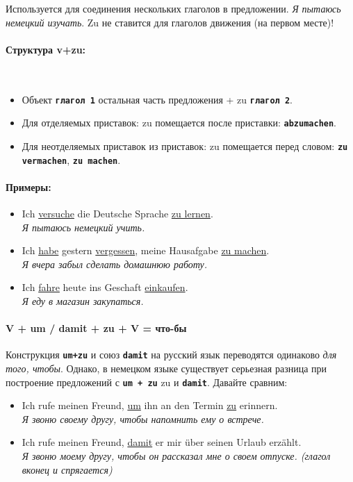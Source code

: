 \documentclass[12pt,a4paper]{report}
\newcommand{\term}[1]{\texttt{\textbf{#1}}}
\newcommand{\satzew}[1]{\underline{#1}}
\newcommand{\ubersatze}[1]{\textit{#1}}
\begin{document}
Используется для соединения нескольких глаголов в предложении. \ubersatze{Я пытаюсь немецкий изучать}. Zu не ставится для глаголов движения (на первом месте)!

\paragraph{Структура v+zu:} ~\\
\begin{itemize}
\item Объект \term{глагол 1} остальная часть предложения + zu \term{глагол 2}.
\item Для отделяемых приставок: zu помещается после приставки: \term{abzumachen}.
\item Для неотделяемых приставок из приставок: zu помещается перед словом: \term{zu vermachen}, \term{zu machen}.
\end{itemize}

\paragraph{Примеры:}
\begin{itemize}
\item Ich \satzew{versuche} die Deutsche Sprache \satzew{zu lernen}.
~\\ \ubersatze{Я пытаюсь немецкий учить.}
\item Ich \satzew{habe} gestern \satzew{vergessen}, meine Hausafgabe \satzew{zu machen}.
~\\ \ubersatze{Я вчера забыл сделать домашнюю работу.}
\item Ich \satzew{fahre} heute ins Geschaft \satzew{einkaufen}.
~\\ \ubersatze{Я еду в магазин закупаться.}
\end{itemize}

\paragraph{V + um / damit + zu + V = что-бы}

Конструкция \term{um+zu} и союз \term{damit} на русский язык переводятся одинаково \ubersatze{для того, чтобы}. Однако, в немецком языке существует серьезная разница при построение предложений с \term{um + zu} zu и \term{damit}. Давайте сравним:

\begin{itemize}
\item Ich rufe meinen Freund, \satzew{um} ihn an den Termin \satzew{zu} erinnern.
~\\ \ubersatze{Я звоню своему другу, чтобы напомнить ему о встрече.}
\item Ich rufe meinen Freund, \satzew{damit} er mir über seinen Urlaub erzählt.
~\\ \ubersatze{Я звоню моему другу, чтобы он рассказал мне о своем отпуске. (глагол вконец и спрягается)}
\end{itemize}
\end{document}
